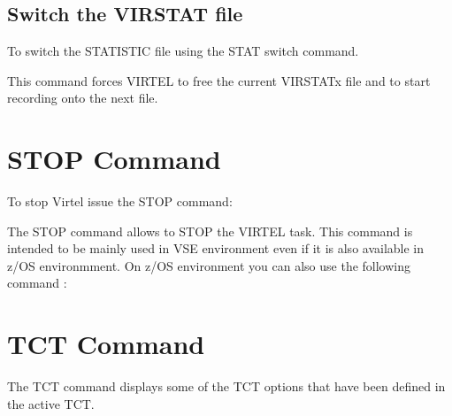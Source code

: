 \documentclass[letterpaper,10pt,english]{sphinxmanual}
\begin{document}
\subsection{Switch the VIRSTAT file}
\label{\detokenize{audit_operations_ and_performance:switch-the-virstat-file}}
To switch the STATISTIC file using the STAT switch command.

\begin{sphinxVerbatim}[commandchars=\\\{\}]
\end{sphinxVerbatim}

This command forces VIRTEL to free the current VIRSTATx file and to start recording onto the next file.

\ignorespaces 

\section{STOP Command}
\label{\detokenize{audit_operations_ and_performance:stop-command}}\label{\detokenize{audit_operations_ and_performance:index-24}}
To stop Virtel issue the STOP command:

\begin{sphinxVerbatim}[commandchars=\\\{\}]
\end{sphinxVerbatim}

The STOP command allows to STOP the VIRTEL task. This command is intended to be mainly used in VSE environment even if it is also available in z/OS environmment. On z/OS environment you can also use the following command :

\begin{sphinxVerbatim}[commandchars=\\\{\}]
 
\end{sphinxVerbatim}

\ignorespaces 

\section{TCT Command}
\label{\detokenize{audit_operations_ and_performance:tct-command}}\label{\detokenize{audit_operations_ and_performance:index-25}}
The TCT command displays some of the TCT options that have been defined in the active TCT.
\end{document}
